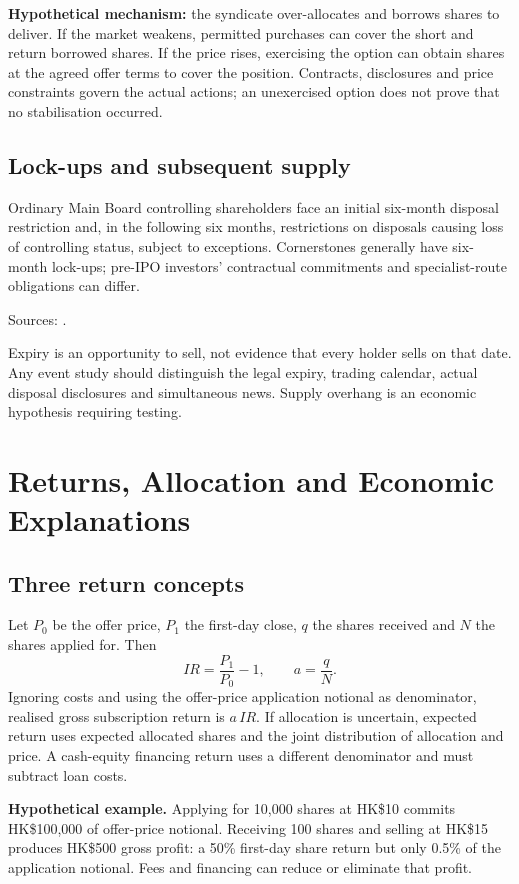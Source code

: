 \documentclass[11pt,a4paper]{article}
\newcommand{\source}[1]{\par{\footnotesize\color{ink}Sources: \cite{#1}.}\par}
\begin{document}
\textbf{Hypothetical mechanism:} the syndicate over-allocates and borrows shares to deliver. If the market weakens, permitted purchases can cover the short and return borrowed shares. If the price rises, exercising the option can obtain shares at the agreed offer terms to cover the position. Contracts, disclosures and price constraints govern the actual actions; an unexercised option does not prove that no stabilisation occurred.

\subsection{Lock-ups and subsequent supply}
Ordinary Main Board controlling shareholders face an initial six-month disposal restriction and, in the following six months, restrictions on disposals causing loss of controlling status, subject to exceptions. Cornerstones generally have six-month lock-ups; pre-IPO investors' contractual commitments and specialist-route obligations can differ.\source{lockhk,cornerfaq}

Expiry is an opportunity to sell, not evidence that every holder sells on that date. Any event study should distinguish the legal expiry, trading calendar, actual disposal disclosures and simultaneous news. Supply overhang is an economic hypothesis requiring testing.

\section{Returns, Allocation and Economic Explanations}
\subsection{Three return concepts}
Let $P_0$ be the offer price, $P_1$ the first-day close, $q$ the shares received and $N$ the shares applied for. Then
\[
IR=\frac{P_1}{P_0}-1,\qquad a=\frac{q}{N}.
\]
Ignoring costs and using the offer-price application notional as denominator, realised gross subscription return is $a\,IR$. If allocation is uncertain, expected return uses expected allocated shares and the joint distribution of allocation and price. A cash-equity financing return uses a different denominator and must subtract loan costs.

\textbf{Hypothetical example.} Applying for 10,000 shares at HK\$10 commits HK\$100,000 of offer-price notional. Receiving 100 shares and selling at HK\$15 produces HK\$500 gross profit: a 50\% first-day share return but only 0.5\% of the application notional. Fees and financing can reduce or eliminate that profit.
\end{document}
